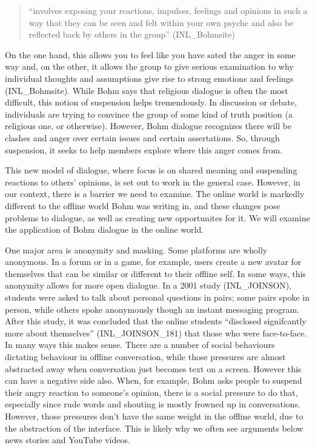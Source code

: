 \documentclass[]{article}
\begin{document}
\begin{quote}
``involves exposing your reactions, impulses, feelings and opinions in
such a way that they can be seen and felt within your own psyche and
also be reflected back by others in the group'' (INL\_Bohmsite)
\end{quote}

On the one hand, this allows you to feel like you have sated the anger
in some way and, on the other, it allows the group to give serious
examination to why individual thoughts and assumptions give rise to
strong emotions and feelings (INL\_Bohmsite). While Bohm says that
religious dialogue is often the most difficult, this notion of
suspension helps tremendously. In discussion or debate, individuals are
trying to convince the group of some kind of truth position (a religious
one, or otherwise). However, Bohm dialogue recognizes there will be
clashes and anger over certain issues and certain assertations. So,
through suspension, it seeks to help members explore where this anger
comes from.

This new model of dialogue, where focus is on shared meaning and
suspending reactions to others' opinions, is set out to work in the
general case. However, in our context, there is a barrier we need to
examine. The online world is markedly different to the offline world
Bohm was writing in, and these changes pose problems to dialogue, as
well as creating new opportunites for it. We will examine the
application of Bohm dialogue in the online world.

One major area is anonymity and masking. Some platforms are wholly
anonymous. In a forum or in a game, for example, users create a new
avatar for themselves that can be similar or different to their offline
self. In some ways, this anonymity allows for more open dialogue. In a
2001 study (INL\_JOINSON), students were asked to talk about personal
questions in pairs; some pairs spoke in person, while others spoke
anonymously though an instant messaging program. After this study, it
was concluded that the online students ``disclosed signifcantly more
about themselves'' (INL\_JOINSON\_181) that those who were face-to-face.
In many ways this makes sense. There are a number of social behaviours
dictating behaviour in offline conversation, while those pressures are
almost abstracted away when conversation just becomes text on a screen.
However this can have a negative side also. When, for example, Bohm asks
people to suspend their angry reaction to someone's opinion, there is a
social pressure to do that, especially since rude words and shouting is
mostly frowned up in conversations. However, those pressures don't have
the same weight in the offline world, due to the abstraction of the
interface. This is likely why we often see arguments below news stories
and YouTube videos.
\end{document}
